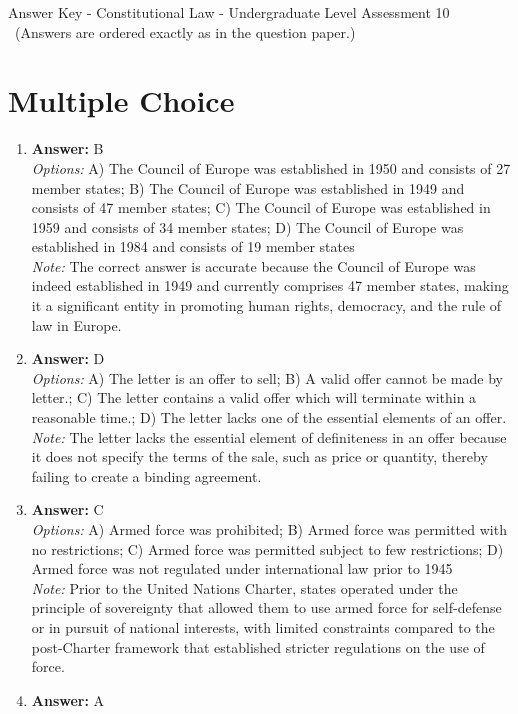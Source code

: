 \documentclass[12pt]{article}
\begin{document}
\begin{center}
Answer Key - Constitutional Law - Undergraduate Level Assessment 10 \
\small (Answers are ordered exactly as in the question paper.)
\end{center}

\section*{Multiple Choice}
\begin{enumerate}[label=\arabic*.]
\item \textbf{Answer:} B
\\ \textit{Options:} A) The Council of Europe was established in 1950 and consists of 27 member states; B) The Council of Europe was established in 1949 and consists of 47 member states; C) The Council of Europe was established in 1959 and consists of 34 member states; D) The Council of Europe was established in 1984 and consists of 19 member states
\\ \textit{Note:} The correct answer is accurate because the Council of Europe was indeed established in 1949 and currently comprises 47 member states, making it a significant entity in promoting human rights, democracy, and the rule of law in Europe.
\item \textbf{Answer:} D
\\ \textit{Options:} A) The letter is an offer to sell; B) A valid offer cannot be made by letter.; C) The letter contains a valid offer which will terminate within a reasonable time.; D) The letter lacks one of the essential elements of an offer.
\\ \textit{Note:} The letter lacks the essential element of definiteness in an offer because it does not specify the terms of the sale, such as price or quantity, thereby failing to create a binding agreement.
\item \textbf{Answer:} C
\\ \textit{Options:} A) Armed force was prohibited; B) Armed force was permitted with no restrictions; C) Armed force was permitted subject to few restrictions; D) Armed force was not regulated under international law prior to 1945
\\ \textit{Note:} Prior to the United Nations Charter, states operated under the principle of sovereignty that allowed them to use armed force for self-defense or in pursuit of national interests, with limited constraints compared to the post-Charter framework that established stricter regulations on the use of force.
\item \textbf{Answer:} A

\end{enumerate}
\end{document}
